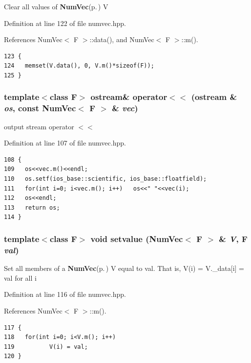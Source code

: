 Clear all values of {\bf Num\-Vec}{\rm (p.\,\pageref{classNumVec})} V 

Definition at line 122 of file numvec.hpp.

References Num\-Vec$<$ F $>$::data(), and Num\-Vec$<$ F $>$::m().

\footnotesize\begin{verbatim}123 {
124   memset(V.data(), 0, V.m()*sizeof(F));
125 }
\end{verbatim}\normalsize 


\subsubsection{\setlength{\rightskip}{0pt plus 5cm}template$<$class F$>$ ostream\& operator$<$$<$ (ostream \& {\em os}, const {\bf Num\-Vec}$<$ F $>$ \& {\em vec})\hspace{0.3cm}{\tt  [inline]}}\label{numvec_8hpp_36c1ac071bd26869e8467036f9a51dc9_36c1ac071bd26869e8467036f9a51dc9}


output stream operator $<$$<$ 

Definition at line 107 of file numvec.hpp.

\footnotesize\begin{verbatim}108 {
109   os<<vec.m()<<endl;
110   os.setf(ios_base::scientific, ios_base::floatfield);
111   for(int i=0; i<vec.m(); i++)   os<<" "<<vec(i);
112   os<<endl;
113   return os;
114 }
\end{verbatim}\normalsize 


\subsubsection{\setlength{\rightskip}{0pt plus 5cm}template$<$class F$>$ void setvalue ({\bf Num\-Vec}$<$ F $>$ \& {\em V}, F {\em val})\hspace{0.3cm}{\tt  [inline]}}\label{numvec_8hpp_bd30a0851e742d36c69575eb38314181_bd30a0851e742d36c69575eb38314181}


Set all members of a {\bf Num\-Vec}{\rm (p.\,\pageref{classNumVec})} V equal to val. That is, V(i) = V.\_\-data[i] = val for all i 

Definition at line 116 of file numvec.hpp.

References Num\-Vec$<$ F $>$::m().

\footnotesize\begin{verbatim}117 {
118   for(int i=0; i<V.m(); i++)
119          V(i) = val;
120 }
\end{verbatim}\normalsize 


